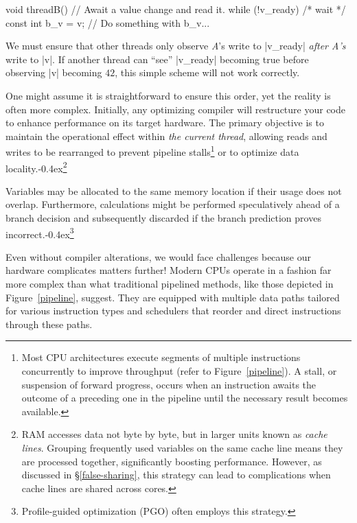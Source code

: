 \documentclass[fontsize=10pt, oneside]{scrartcl}
\newcommand{\punckern}{\kern-0.4ex}
\newcommand{\cplusplus}[1]{C\kern-0.1ex\raisebox{0.15ex}{\texttt{++}}}
\newcommand{\fig}[1]{Figure~\ref{#1}}
\newcommand{\introduce}[1]{\textit{#1}}
\newcommand{\secref}[1]{\hyperref[#1]{\textsc{\S}\ref*{#1}}}
\begin{document}
\begin{ccode}
void threadB()
{
    // Await a value change and read it.
    while (!v_ready) { /* wait */ }
    const int b_v = v;
    // Do something with b_v...
}
\end{ccode}
We must ensure that other threads only observe \textit{A}'s write to \cc|v_ready| \emph{after A's} write to \cc|v|.
If another thread can ``see'' \cc|v_ready| becoming true before observing \cc|v| becoming $42$,
this simple scheme will not work correctly.

One might assume it is straightforward to ensure this order,
yet the reality is often more complex.
Initially, any optimizing compiler will restructure your code to enhance performance on its target hardware.
The primary objective is to maintain the operational effect within \emph{the current thread},
allowing reads and writes to be rearranged to prevent pipeline stalls\footnote{%
Most \textsc{CPU} architectures execute segments of multiple instructions concurrently to improve throughput (refer to \fig{pipeline}).
A stall, or suspension of forward progress, occurs when an instruction awaits the outcome of a preceding one in the pipeline until the necessary result becomes available.} or to optimize data locality.\punckern\footnote{%
\textsc{RAM} accesses data not byte by byte, but in larger units known as \introduce{cache lines}.
Grouping frequently used variables on the same cache line means they are processed together,
significantly boosting performance. However, as discussed in \secref{false-sharing},
this strategy can lead to complications when cache lines are shared across cores.}

Variables may be allocated to the same memory location if their usage does not overlap.
Furthermore, calculations might be performed speculatively ahead of a branch decision and subsequently discarded if the branch prediction proves incorrect.\punckern\footnote{%
Profile-guided optimization (PGO) often employs this strategy.}

Even without compiler alterations,
we would face challenges because our hardware complicates matters further!
Modern \textsc{CPU}s operate in a fashion far more complex than what traditional pipelined methods,
like those depicted in \fig{pipeline}, suggest.
They are equipped with multiple data paths tailored for various instruction types and schedulers that reorder and direct instructions through these paths.
\end{document}

